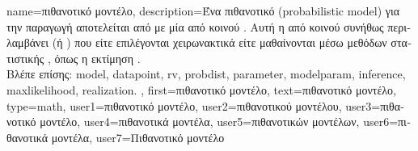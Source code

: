 {name={\foreignlanguage{greek}{πιθανοτικό μοντέλο}},
	description={\foreignlanguage{greek}{Ένα πιθανοτικό}  
		(probabilistic model) \foreignlanguage{greek}{για την παραγωγή}  \foreignlanguage{greek}{αποτελείται 
		από}  \foreignlanguage{greek}{με μία από κοινού}  \cite{BertsekasProb}. 
		\foreignlanguage{greek}{Αυτή η από κοινού}  \foreignlanguage{greek}{συνήθως περιλαμβάνει} 
		 (\foreignlanguage{greek}{ή} ) \foreignlanguage{greek}{που εί\-τε 
		επιλέγονται χειρωνακτικά είτε μαθαίνονται μέσω μεθόδων στατιστικής} , \foreignlanguage{greek}{όπως 
		η εκτίμηση}  \cite{LC}.
		\\
		\foreignlanguage{greek}{Βλέπε επίσης:} \gls{model}, \gls{datapoint}, \gls{rv}, \gls{probdist}, \gls{parameter}, 
		\gls{modelparam}, \gls{inference}, \gls{maxlikelihood}, \gls{realization}. }, 
	first={\foreignlanguage{greek}{πιθανοτικό μοντέλο}}, 
	text={\foreignlanguage{greek}{πιθανοτικό μοντέλο}},
	type=math,
	user1={\foreignlanguage{greek}{πιθανοτικό μοντέλο}}, %
   	user2={\foreignlanguage{greek}{πιθανοτι\-κού μοντέλου}}, %
	user3={\foreignlanguage{greek}{πιθανοτικό μοντέλο}}, %
	user4={\foreignlanguage{greek}{πιθανοτικά μοντέλα}}, %
   	user5={\foreignlanguage{greek}{πιθανοτικών μοντέλων}}, %
	user6={\foreignlanguage{greek}{πιθανοτικά μοντέλα}}, %
	user7={\foreignlanguage{greek}{Πιθανοτικό μοντέλο}} %
}

